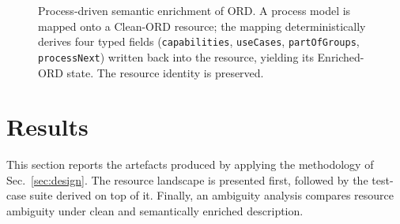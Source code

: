 \documentclass[10pt,twocolumn]{article}
\begin{document}
\begin{figure}[t]
{}%
  \caption{Process-driven semantic enrichment of ORD. A process model is mapped onto a Clean-ORD resource; the mapping deterministically derives four typed fields (\texttt{capabilities}, \texttt{useCases}, \texttt{partOfGroups}, \texttt{processNext}) written back into the resource, yielding its Enriched-ORD state. The resource identity is preserved.}
  \label{fig:enrichment}
\end{figure}




\section{Results}
\label{sec:results}



This section reports the artefacts produced by applying the methodology of Sec.~\ref{sec:design}. The resource landscape is presented first, followed by the test-case suite derived on top of it. Finally, an ambiguity analysis compares resource ambiguity under clean and semantically enriched description.
\end{document}
